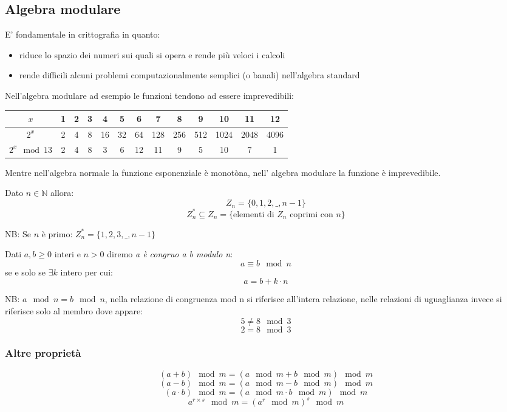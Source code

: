 \subsection{Algebra modulare}
E' fondamentale in crittografia in quanto:
\begin{itemize}
    \item riduce lo spazio dei numeri sui quali si opera e rende più veloci i calcoli
    \item rende difficili alcuni problemi computazionalmente semplici (o banali) nell'algebra standard
\end{itemize}

Nell'algebra modulare ad esempio le funzioni tendono ad essere imprevedibili:
\begin{table}[ht!]
    \centering
    \small
    \begin{tabular}{c|c c c c c c c c c c c c}
        $x$ & 1 & 2 & 3 & 4 & 5 & 6 & 7 & 8 & 9 & 10 & 11 & 12  \\
        \hline
        $2^{x}$ & 2 & 4 & 8 & 16 & 32 & 64 & 128 & 256 & 512 & 1024 & 2048 & 4096  \\
        $2^{x} \mod 13$ & 2 & 4 & 8 & 3 & 6 & 12 & 11 & 9 & 5 & 10 & 7 & 1  \\
    \end{tabular}
\end{table}

Mentre nell'algebra normale la funzione esponenziale è monotòna, nell' algebra modulare la funzione è imprevedibile.

Dato $n \in \mathbb{N}$ allora:
$$ Z_{n} = \{ 0, 1, 2, \_, n-1 \} $$
$$ Z_{n}^{*} \subseteq Z_{n} = \{\text{elementi di $Z_{n}$ coprimi con $n$}\} $$


NB: Se $n$ è primo: $Z_{n}^* = \{1, 2, 3, \_, n-1\}$

Dati $a, b \geq 0$ interi e $n > 0$ diremo \emph{a è congruo a b modulo n}:
$$ a \equiv b \mod n $$
se e solo se $\exists k$ intero per cui:
$$ a = b + k \cdot n $$

NB: $a \mod n = b \mod n$, nella relazione di congruenza mod n si riferisce all'intera relazione, nelle relazioni di uguaglianza invece si riferisce solo al membro dove appare:
$$ 5 \neq 8 \mod 3 $$
$$ 2 = 8 \mod 3 $$

\subsubsection{Altre proprietà}
$$ (a+b) \mod m = (a \mod m + b \mod m) \mod m $$
$$ (a-b) \mod m = (a \mod m - b \mod m) \mod m $$
$$ (a \cdot b) \mod m = (a \mod m \cdot b \mod m) \mod m $$
$$ a^{r \times s} \mod m = (a^r \mod m)^{s} \mod m $$

